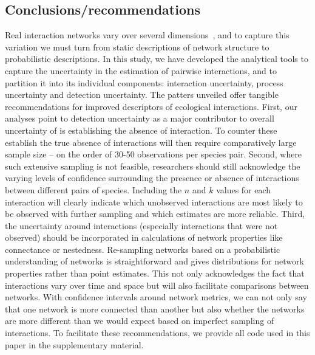 \documentclass[12pt]{article}
\begin{document}
\begin{spacing}{2.0}
\section*{Conclusions/recommendations}

  Real interaction networks vary over several dimensions~\citep{Kitching1987,Olesen2011a,Pires2011a,Baiser2012,Fodrie2015,Novak2015}, and to capture this variation we must turn from static descriptions of network structure to probabilistic descriptions. In this study, we have developed the analytical tools to capture the uncertainty in the estimation of pairwise interactions, and to partition it into its individual components: interaction uncertainty, process uncertainty and detection uncertainty. The patters unveiled offer tangible recommendations for improved descriptors of ecological interactions. First, our analyses point to detection uncertainty as a major contributor to overall uncertainty of is establishing the absence of interaction. To counter these establish the true absence of interactions will then require comparatively large sample size – on the order of 30-50 observations per species pair. Second, where such extensive sampling is not feasible, researchers should still acknowledge the varying levels of confidence surrounding the presence or absence of interactions between different pairs of species. Including the $n$ and $k$ values for each interaction will clearly indicate which unobserved interactions are most likely to be observed with further sampling and which estimates are more reliable. Third, the uncertainty around interactions (especially interactions that were not observed) should be incorporated in calculations of network properties like connectance or nestedness. Re-sampling networks based on a probabilistic understanding of networks is straightforward and gives distributions for network properties rather than point estimates. This not only acknowledges the fact that interactions vary over time and space but will also facilitate comparisons between networks. With confidence intervals around network metrics, we can not only say that one network is more connected than another but also whether the networks are more different than we would expect based on imperfect sampling of interactions. To facilitate these recommendations, we provide all code used in this paper in the supplementary material. 




\end{spacing}
\end{document}
